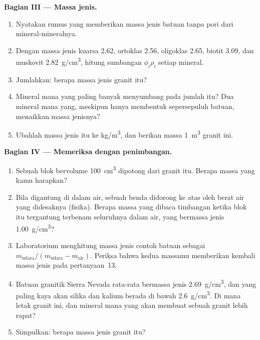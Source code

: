 \begin{problem}
\medskip
\noindent\textbf{Bagian III --- Massa jenis.}
\begin{enumerate}[resume]
  \item Nyatakan rumus yang memberikan massa jenis batuan tanpa pori dari
        mineral-mineralnya.
  \item Dengan massa jenis kuarsa \qty{2.62}{}, ortoklas \qty{2.56}{},
        oligoklas \qty{2.65}{}, biotit \qty{3.09}{}, dan muskovit
        \qty{2.82}{g/cm^3}, hitung sumbangan $\phi_i \rho_i$ setiap
        mineral.
  \item Jumlahkan: berapa massa jenis granit itu?
  \item Mineral mana yang paling banyak menyumbang pada jumlah itu? Dua mineral
        mana yang, meskipun hanya membentuk sepersepuluh batuan, menaikkan massa
        jenisnya?
  \item Ubahlah massa jenis itu ke \unit{kg/m^3}, dan berikan massa
        \qty{1}{m^3} granit ini.
\end{enumerate}

\medskip
\noindent\textbf{Bagian IV --- Memeriksa dengan penimbangan.}
\begin{enumerate}[resume]
  \item Sebuah blok bervolume \qty{100}{cm^3} dipotong dari granit itu. Berapa
        massa yang kamu harapkan?
  \item Bila digantung di dalam air, sebuah benda didorong ke atas oleh berat air
        yang didesaknya (fisika). Berapa massa yang dibaca timbangan ketika blok
        itu tergantung terbenam seluruhnya dalam air, yang bermassa jenis
        \qty{1.00}{g/cm^3}?
  \item Laboratorium menghitung massa jenis contoh batuan sebagai
        $m_{\text{udara}}/(m_{\text{udara}} - m_{\text{air}})$. Periksa bahwa
        kedua massamu memberikan kembali massa jenis pada pertanyaan~13.
  \item Batuan granitik Sierra Nevada rata-rata bermassa jenis \qty{2.69}{g/cm^3},
        dan yang paling kaya akan silika dan kalium berada di bawah
        \qty{2.6}{g/cm^3}. Di mana letak granit ini, dan mineral mana yang akan
        membuat sebuah granit lebih rapat?
  \item Simpulkan: berapa massa jenis granit itu?
\end{enumerate}
\end{problem}
